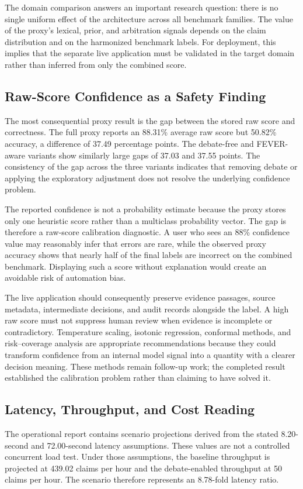 \documentclass[12pt,a4paper,openany]{report}
\begin{document}
The domain comparison answers an important research question: there is no
single uniform effect of the architecture across all benchmark families.
The value of the proxy's lexical, prior, and arbitration signals depends
on the claim distribution and on the harmonized benchmark labels. For deployment, this implies that the separate live application must be validated
in the target domain rather than inferred from only the combined
score.

\subsection{Raw-Score Confidence as a Safety Finding}
The most consequential proxy result is the gap between the stored raw score
and correctness. The full proxy reports an 88.31\% average raw score
but 50.82\% accuracy, a difference of 37.49 percentage points. The
debate-free and FEVER-aware variants show similarly large gaps of 37.03 and
37.55 points. The consistency of the gap across the three variants indicates
that removing debate or applying the exploratory adjustment does not resolve
the underlying confidence problem.

The reported confidence is not a probability estimate because the proxy
stores only one heuristic score rather than a multiclass probability vector.
The gap is therefore a raw-score calibration diagnostic. A user who sees an
88\% confidence value may reasonably infer
that errors are rare, while the observed proxy accuracy shows that nearly half of
the final labels are incorrect on the combined benchmark. Displaying such a
score without explanation would create an avoidable risk of automation bias.

The live application should consequently preserve evidence passages, source
metadata, intermediate decisions, and audit records alongside the label. A
high raw score must not suppress human review when evidence is incomplete or
contradictory. Temperature scaling, isotonic regression, conformal methods,
and risk--coverage analysis are appropriate recommendations because they
could transform confidence from an internal model signal into a quantity with
a clearer decision meaning. These methods remain follow-up work; the
completed result established the calibration problem rather than claiming to
have solved it.

\subsection{Latency, Throughput, and Cost Reading}
The operational report contains scenario projections derived from the stated
8.20-second and 72.00-second latency assumptions. These values are not a
controlled concurrent load test. Under those assumptions, the baseline
throughput is projected at 439.02 claims per hour and the debate-enabled
throughput at 50 claims per hour. The scenario therefore represents an
8.78-fold latency ratio.
\end{document}
